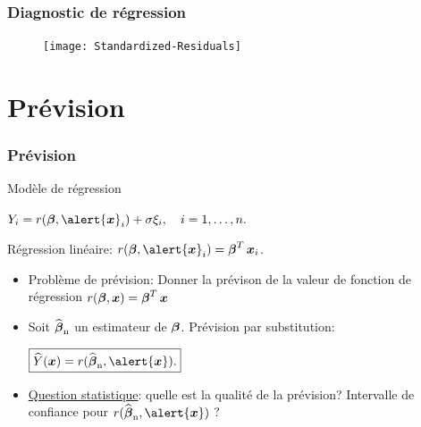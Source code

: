 \begin{frame}
\frametitle{Diagnostic de régression}
\begin{figure}
  \centering
  \texttt{[image: Standardized-Residuals]}\\
\end{figure}
\end{frame}












\section{Prévision}

\begin{frame}
\frametitle{Prévision}

Modèle de régression \vspace{2mm} \centerline{$ Y_i=
r(\truebeta, \alert{\bx}_i)+ \sigma \xi_i, \quad i=1,\dots,n.$}
Régression
\alert{linéaire}: $r(\truebeta, \alert{\bx}_i)=\truebeta^T
\bx_i$.
\begin{itemize}
\item \alert{Problème de prévision}:
Donner la prévison de la valeur de fonction de
régression $r(\boldsymbol{\beta},  \operatorname{\boldsymbol{x}})=\boldsymbol{\beta}^T \operatorname{\boldsymbol{x}}$\\
\item Soit $\operatorname{\widehat{\boldsymbol{\beta}}_n}$ un estimateur de $\boldsymbol{\beta}$. \alert{Prévision par
substitution:}
 \centerline{$\boxed{ \widehat Y(\bx) = r(\estregress, \alert{\bx}).}$}
\item \underline{Question statistique}: quelle est la qualité de la prévision?
\alert{Intervalle de confiance} pour $r(\estregress, \alert{\bx})$ ?
\end{itemize}
\end{frame}



